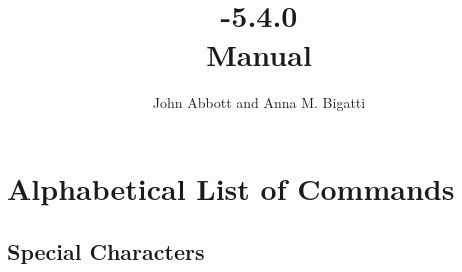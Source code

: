 \documentclass[a4paper]{mybook}
\title{\Huge{\textsf{{\cocoa-}5.4.0\\Manual}}}
\author{John Abbott and Anna M. Bigatti}
\begin{document}
\maketitle

\tableofcontents





\part{Alphabetical List of Commands}
\setcounter{chapter}{-1}


\chapter{Special Characters}  %
\label{Special Characters}
\end{document}
